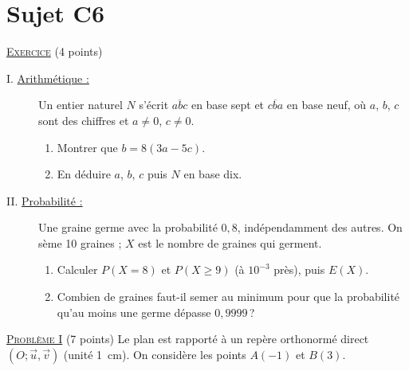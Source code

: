 \newpage
\section{Sujet C6}
\noindent \underline{\textsc{Exercice}} (4 points)
\begin{description}
\item[I. \underline{Arithm\'etique :}]
      Un entier naturel $N$ s'\'ecrit $\overline{abc}$ en base sept et $\overline{cba}$ en base neuf, o\`u $a$, $b$, $c$ sont des chiffres
      et $a \neq 0$, $c \neq 0$.
      \begin{enumerate}
      \item Montrer que $b = 8(3a - 5c)$.
      \item En d\'eduire $a$, $b$, $c$ puis $N$ en base dix.
      \end{enumerate}
\item[II. \underline{Probabilit\'e :}]
      Une graine germe avec la probabilit\'e $0{,}8$, ind\'ependamment des autres. On s\`eme 10 graines ; $X$ est le nombre de graines
      qui germent.
      \begin{enumerate}
      \item Calculer $P(X = 8)$ et $P(X \geq 9)$ (\`a $10^{-3}$ pr\`es), puis $E(X)$.
      \item Combien de graines faut-il semer au minimum pour que la probabilit\'e qu'au moins une germe d\'epasse $0{,}9999$\,?
      \end{enumerate}
\end{description}

\noindent \underline{\textsc{Probl\`eme I}} (7 points) \newline
Le plan est rapport\'e \`a un rep\`ere orthonorm\'e direct $(O ; \vec{u}, \vec{v})$ (unit\'e 1~cm). On consid\`ere les points $A(-1)$ et $B(3)$.

